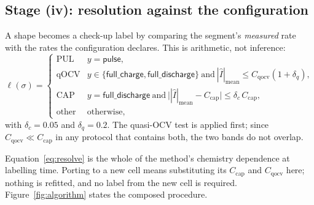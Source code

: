 \documentclass[preprint,3p,number]{elsarticle}
\begin{document}
\subsection{Stage (iv): resolution against the configuration}
\label{sec:resolution}

A shape becomes a check-up label by comparing the segment's \emph{measured}
rate with the rates the configuration declares. This is arithmetic, not
inference:
\begin{equation}
\ell(\sigma) =
\begin{cases}
\mathrm{PUL}  & y = \textsf{pulse},\\[2pt]
\mathrm{qOCV} & y \in \{\textsf{full\_charge}, \textsf{full\_discharge}\}
                \ \text{and}\ |\hat{I}|_{\text{mean}}
                \le C_{\mathrm{qocv}}(1+\delta_{q}),\\[2pt]
\mathrm{CAP}  & y = \textsf{full\_discharge}
                \ \text{and}\
                \bigl| |\hat{I}|_{\text{mean}} - C_{\mathrm{cap}} \bigr|
                \le \delta_{c}\, C_{\mathrm{cap}},\\[2pt]
\text{other}  & \text{otherwise},
\end{cases}
\label{eq:resolve}
\end{equation}
with $\delta_{c} = 0.05$ and $\delta_{q} = 0.2$. The quasi-OCV test is applied
first; since $C_{\mathrm{qocv}} \ll C_{\mathrm{cap}}$ in any protocol that
contains both, the two bands do not overlap.

Equation~\eqref{eq:resolve} is the whole of the method's chemistry dependence
at labelling time. Porting to a new cell means substituting its
$C_{\mathrm{cap}}$ and $C_{\mathrm{qocv}}$ here; nothing is refitted, and no
label from the new cell is required. Figure~\ref{fig:algorithm} states the
composed procedure.
\end{document}
